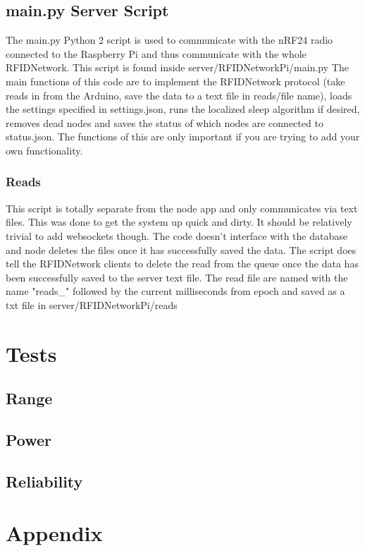 \documentclass[12pt]{article}
\begin{document}
\subsection{main.py Server Script}
The main.py Python 2 script is used to communicate with the nRF24 radio connected to the Raspberry Pi and thus communicate with the whole RFIDNetwork.  This script is found inside server/RFIDNetworkPi/main.py The main functions of this code are to implement the RFIDNetwork protocol (take reads in from the Arduino, save the data to a text file in reads/file name), loads the settings specified in settings.json, runs the localized sleep algorithm if desired, removes dead nodes and saves the status of which nodes are connected to status.json.  The functions of this are only important if you are trying to add your own functionality.\\

\subsubsection{Reads}
This script is totally separate from the node app and only communicates via text files.  This was done to get the system up quick and dirty.  It should be relatively trivial to add websockets though.  The code doesn't interface with the database and node deletes the files once it has successfully saved the data.  The script does tell the RFIDNetwork clients to delete the read from the queue once the data has been successfully saved to the server text file. The read file are named with the name "reads\_" followed by the current milliseconds from epoch and saved as a txt file in server/RFIDNetworkPi/reads

\section{Tests}
\subsection{Range}
\subsection{Power}
\subsection{Reliability}

\section{Appendix}
\end{document}
